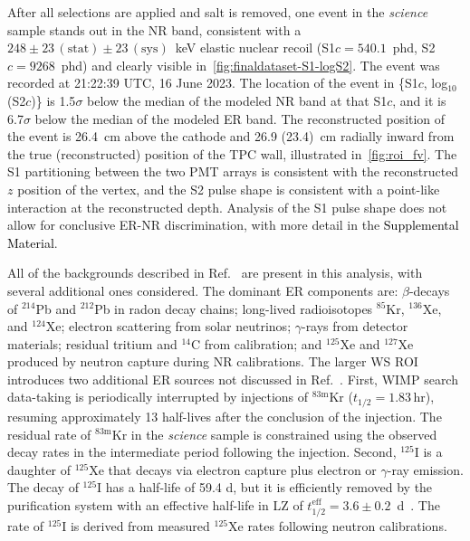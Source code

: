 After all selections are applied and salt is removed, one event in the \emph{science} sample stands out in the NR band, consistent with a $248\pm23\,\mathrm{(stat)}\pm23\,\mathrm{(sys)}$~keV elastic nuclear recoil (S1$c = 540.1$~phd, S2$c = 9268$~phd) and clearly visible in~\autoref{fig:finaldataset-S1-logS2}. The event was recorded at 21:22:39 UTC, 16 June 2023. The location of the event in \{S1$c$, log$_{10}$(S2$c$)\} is 1.5$\sigma$ below the median of the modeled NR band at that S1$c$, and it is 6.7$\sigma$ below the median of the modeled ER band.
The reconstructed position of the event is 26.4~cm above the cathode and 26.9 (23.4)~cm radially inward from the true (reconstructed) position of the TPC wall, illustrated in~\autoref{fig:roi_fv}. The S1 partitioning between the two PMT arrays is consistent with the reconstructed $z$ position of the vertex, and the S2 pulse shape is consistent with a point-like interaction at the reconstructed depth. Analysis of the S1 pulse shape does not allow for conclusive ER-NR discrimination, with more detail in the \textcolor{black}{Supplemental Material}.





All of the backgrounds described in Ref.~\cite{LZ:SR3_WS2024} are present in this analysis, with several additional ones considered. The dominant ER components are: $\beta$-decays of $^{214}$Pb and $^{212}$Pb in radon decay chains; long-lived radioisotopes $^{85}$Kr, $^{136}$Xe, and $^{124}$Xe; electron scattering from solar neutrinos; $\gamma$-rays from detector materials; residual tritium and $^{14}$C from calibration; and ${}^{125}$Xe and ${}^{127}$Xe produced by neutron capture during NR calibrations.  
The larger WS ROI introduces two additional ER sources not discussed in Ref.~\cite{LZ:SR3_WS2024}. First, WIMP search data-taking is periodically interrupted by injections of $^{83\mathrm{m}}$Kr ($t_{1/2}=1.83$\,hr), resuming approximately 13 half-lives after the conclusion of the injection. 
The residual rate of $^{83\mathrm{m}}$Kr in the \emph{science} sample is constrained using the observed decay rates in the intermediate period following the injection. Second, ${}^{125}$I is a daughter of ${}^{125}$Xe that decays via electron capture plus electron or $\gamma$-ray emission. 
The decay of  ${}^{125}$I has a half-life of 59.4 d, but it is efficiently removed by the purification system with an effective half-life in LZ of $t_{1/2}^{\mathrm{eff}} = 3.6 \pm 0.2$~d~\cite{LZ:2024wvs}. 
The rate of ${}^{125}$I is derived from measured ${}^{125}$Xe rates following neutron calibrations.


